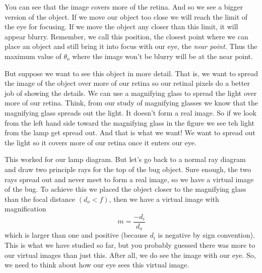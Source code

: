 \documentclass{article}
\begin{document}
You can see that the image covers more of the retina. And so we see a bigger
version of the object. If we move our object too close we will reach the
limit of the eye for focusing. If we move the object any closer
than this limit, it will appear blurry. Remember, we call this position, the
closest point where we can place an object and still bring it into focus
with our eye, the \emph{near point.} Thus the maximum value of $\theta _{o}$
where the image won't be blurry will be at the near point.

But suppose we want to see this object in more detail. That is, we want to
spread the image of the object over more of our retina so our retinal pixels
do a better job of showing the details. We can use a magnifying glass to
spread the light over more of our retina. Think, from our study of
magnifying glasses we know that the magnifying glass spreads out the light. 
It doesn't form a real image. So
if we look from the left hand side toward the magnifying glass in the figure
we see teh light from the lamp get spread out. And that is what we want! We
want to spread out the light so it covers more of our retina once it enters
our eye.

This worked for our lamp diagram. But let's go back to a normal ray diagram
and draw two principle rays for the top of the bug object.  Sure enough, the two rays spread
out and never meet to form a real image, so we have a virtual image of the
bug. To achieve this we placed the object closer to the magnifying glass
than the focal distance $(d_{o}<f)$, then we have a virtual image with
magnification 
\begin{equation}
m=\frac{-d_{i}}{d_{o}}
\end{equation}%
which is larger than one and positive (because $d_{i}$ is negative by sign
convention). This is what we have studied so far, but you probably guessed
there was more to our virtual images than just this. After all, we do see
the image with our eye. So, we need to think about how our eye sees this
virtual image.
\end{document}

